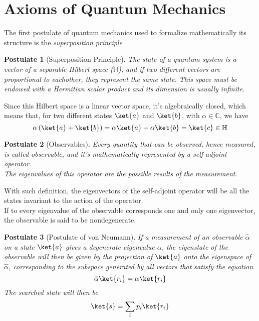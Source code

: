 \documentclass[a4paper, 11pt]{book}
\newcommand{\1}{\opr{\mathds{1}}}
\newcommand{\opr}[1]{\hat{#1}}
\newtheorem{pos}{Postulate}
\theoremstyle{plain}
\begin{document}
	\section{Axioms of Quantum Mechanics}
	The first postulate of quantum mechanics used to formalize mathematically its structure is the \textit{superposition principle}
	\begin{pos}[Superposition Principle]
		The state of a quantum system is a vector of a separable Hilbert space ($\mathbb{H}$), and if two different vectors are proportional to eachother, they represent the same state. This space must be endowed with a Hermitian scalar product and its dimension is usually infinite.
	\end{pos}
	Since this Hilbert space is a linear vector space, it's algebraically closed, which means that, for two different states $\ket{a}$ and $\ket{b}$, with $\alpha\in\mathbb{C}$, we have
	\begin{equation}
		\alpha\left( \ket{a}+\ket{b} \right)=\alpha\ket{a}+\alpha\ket{b}=\ket{c}\in\mathbb{H}
		\label{eq:algebraiclosed}
	\end{equation}
	\begin{pos}[Observables]
		Every quantity that can be observed, hence measured, is called observable, and it's mathematically represented by a self-adjoint operator.\\
		The eigenvalues of this operator are the possible results of the measurement.
	\end{pos}
	With such definition, the eigenvectors of the self-adjoint operator will be all the states invariant to the action of the operator.\\
	If to every eigenvalue of the observable corresponds one and only one eigenvector, the observable is said to be nondegenerate.
	\begin{pos}[Postulate of von Neumann]
		If a measurement of an observable $\opr{\alpha}$ on a state $\ket{a}$ gives a degenerate eigenvalue $\alpha$, the eigenstate of the observable will then be given by the projection of $\ket{a}$ onto the eigenspace of $\opr{\alpha}$, corresponding to the subspace generated by all vectors that satisfy the equation
		\begin{equation*}
			\opr{\alpha}\ket{r_i}=\alpha\ket{r_i}
		\end{equation*}
		The searched state will then be
		\begin{equation*}
			\ket{s}=\sum_ip_i\ket{r_i}
		\end{equation*}
	\end{pos}
\end{document}
